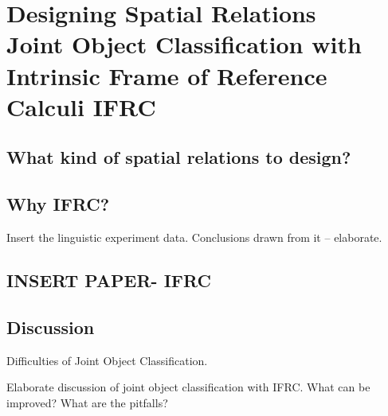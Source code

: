 \chapter[Designing Spatial Relations]{Designing Spatial Relations\\ {\Large Joint Object Classification with Intrinsic Frame of Reference Calculi IFRC}}
\label{chap:ifrc}

\section{What kind of spatial relations to design?}
\section{Why IFRC?}
Insert the linguistic experiment data. Conclusions drawn from it -- elaborate.
\section{INSERT PAPER- IFRC}
\section{Discussion}
Difficulties of Joint Object Classification.

Elaborate discussion of joint object classification with IFRC. What can be 
improved? What are the pitfalls?
